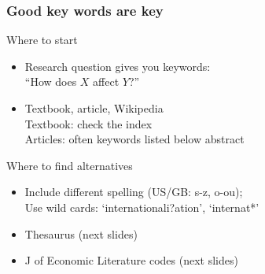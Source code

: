 \documentclass[%
	shownavigationbar=	false,%
	showsidebar= 		false,%
	fleqn,%
	xcolor=			{usenames, svgnames},%
	usepdftitle=			false,%
]{beamer}
\begin{document}
\begin{frame}
\frametitle{Good key words are key}
\begin{block}{Where to start}
\begin{itemize}
	\item Research question gives you keywords:\\
	``How does $X$ affect $Y$?''\\
	\item Textbook, article, Wikipedia\\
	Textbook: check the index \\
	Articles: often keywords listed below abstract
\end{itemize}
\end{block}
\begin{block}{Where to find alternatives}
	\begin{itemize}
	\item Include different spelling (US/GB: s-z, o-ou); \\
	Use wild cards: `internationali?ation', `internat*'
	\item Thesaurus (next slides)
	\item J of Economic Literature codes (next slides)
\end{itemize}
\end{block}
\end{frame}
\end{document}
